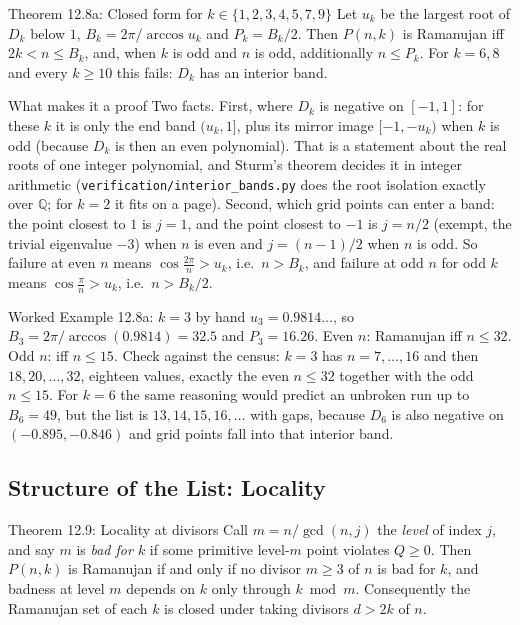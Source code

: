\documentclass[11pt]{article}
\begin{document}
\begin{thmbox}{Theorem 12.8a: Closed form for $k\in\{1,2,3,4,5,7,9\}$}
Let $u_k$ be the largest root of $D_k$ below $1$, $B_k=2\pi/\arccos u_k$ and $P_k=B_k/2$. Then $P(n,k)$ is Ramanujan iff $2k<n\le B_k$, and, when $k$ is odd and $n$ is odd, additionally $n\le P_k$. For $k=6,8$ and every $k\ge10$ this fails: $D_k$ has an interior band.
\end{thmbox}

\begin{intubox}{What makes it a proof}
Two facts. First, where $D_k$ is negative on $[-1,1]$: for these $k$ it is only the end band $(u_k,1]$, plus its mirror image $[-1,-u_k)$ when $k$ is odd (because $D_k$ is then an even polynomial). That is a statement about the real roots of one integer polynomial, and Sturm's theorem decides it in integer arithmetic (\texttt{verification/interior\_bands.py} does the root isolation exactly over $\mathbb Q$; for $k=2$ it fits on a page). Second, which grid points can enter a band: the point closest to $1$ is $j=1$, and the point closest to $-1$ is $j=n/2$ (exempt, the trivial eigenvalue $-3$) when $n$ is even and $j=(n-1)/2$ when $n$ is odd. So failure at even $n$ means $\cos\frac{2\pi}{n}>u_k$, i.e.\ $n>B_k$, and failure at odd $n$ for odd $k$ means $\cos\frac{\pi}{n}>u_k$, i.e.\ $n>B_k/2$.
\end{intubox}

\begin{callbox}{Worked Example 12.8a: $k=3$ by hand}
$u_3=0.9814\ldots$, so $B_3=2\pi/\arccos(0.9814)=32.5$ and $P_3=16.26$. Even $n$: Ramanujan iff $n\le32$. Odd $n$: iff $n\le15$. Check against the census: $k=3$ has $n=7,\dots,16$ and then $18,20,\dots,32$, eighteen values, exactly the even $n\le32$ together with the odd $n\le15$. For $k=6$ the same reasoning would predict an unbroken run up to $B_6=49$, but the list is $13,14,15,16,\dots$ with gaps, because $D_6$ is also negative on $(-0.895,-0.846)$ and grid points fall into that interior band.
\end{callbox}

\subsection{Structure of the List: Locality}

\begin{thmbox}{Theorem 12.9: Locality at divisors}
Call $m=n/\gcd(n,j)$ the \emph{level} of index $j$, and say $m$ is \emph{bad for $k$} if some primitive level-$m$ point violates $Q\ge0$. Then $P(n,k)$ is Ramanujan if and only if no divisor $m\ge3$ of $n$ is bad for $k$, and badness at level $m$ depends on $k$ only through $k\bmod m$. Consequently the Ramanujan set of each $k$ is closed under taking divisors $d>2k$ of $n$.
\end{thmbox}
\end{document}
